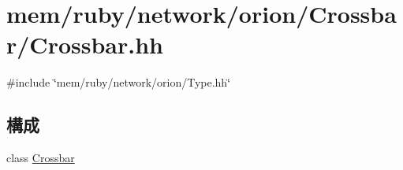 \hypertarget{Crossbar_8hh}{
\section{mem/ruby/network/orion/Crossbar/Crossbar.hh}
\label{Crossbar_8hh}
}
{\ttfamily \#include \char`\"{}mem/ruby/network/orion/Type.hh\char`\"{}}\par
\subsection*{構成}
\begin{DoxyCompactItemize}
\item 
class \hyperlink{classCrossbar}{Crossbar}
\end{DoxyCompactItemize}
